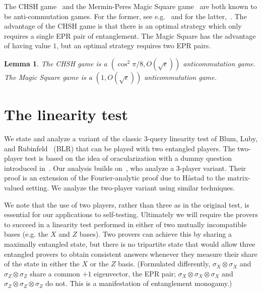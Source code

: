 \documentclass[11pt,letterpaper]{article}
\newcommand{\<}{\langle}
\renewcommand{\>}{\rangle}
\newtheorem{lemma}[theorem]{Lemma}
\newcommand{\eps}{\epsilon}
\begin{document}
The CHSH game~\cite{CHSH69} and the Mermin-Peres Magic Square game~\cite{mermin1990simple,peres1990incompatible} are both known to be anti-commutation games. For the former, see e.g.~\cite{McKagueYS12rigidity} and for the latter,~\cite{wu2016device,CN16}. The advantage of the CHSH game is that there is an optimal strategy which only requires a single EPR pair of entanglement. The Magic Square has the advantage of having value $1$, but an optimal strategy requires two EPR pairs. 

\begin{lemma}
The CHSH game is a $(\cos^2 \pi/8,O(\sqrt{\eps}))$ anticommutation game. 
The Magic Square game is a $(1,O(\sqrt{\eps}))$ anticommutation game. 
\end{lemma}


\section{The linearity test}
\label{sec:linearity}

We state and analyze a variant of the classic 3-query linearity test of Blum, Luby, and Rubinfeld~\cite{BLR93} (BLR) that can be played with two entangled players. The two-player test is based on the idea of oracularization with a dummy question introduced in~\cite{IKM09}.  Our analysis builds on~\cite{IV12}, who analyze a $3$-player variant. Their proof is an extension of the Fourier-analytic proof due to H{\aa}stad to the matrix-valued setting. We analyze the two-player variant using similar techniques. 

We note that the use of two players, rather than three as in
the original test, is essential for our applications to
self-testing. Ultimately we will require the provers to succeed in a linearity test performed in either of two mutually incompatible bases (e.g. the $X$ and $Z$ bases). Two provers
can achieve this by sharing a maximally entangled state, but there is no {tripartite} state that would allow three entangled provers to obtain consistent answers whenever they measure their share of the state in either the $X$ or the $Z$ basis. (Formulated differently, $\sigma_X\otimes \sigma_X$ and $\sigma_Z\otimes \sigma_Z$ share a common $+1$ eigenvector, the EPR pair; $\sigma_X\otimes \sigma_X \otimes \sigma_X$ and $\sigma_Z\otimes \sigma_Z \otimes \sigma_Z$ do not. This is a manifestation of entanglement monogamy.)
\end{document}

